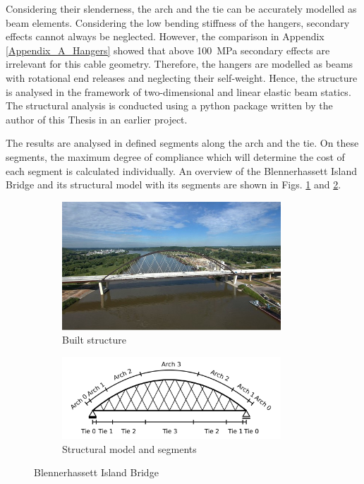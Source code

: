 Considering their slenderness, the arch and the tie can be accurately modelled as beam elements. Considering the low bending stiffness of the hangers, secondary effects cannot always be neglected. However, the comparison in Appendix \ref{Appendix_A_Hangers} showed that above \SI{100}{MPa} secondary effects are irrelevant for this cable geometry. Therefore, the hangers are modelled as beams with rotational end releases and neglecting their self-weight. Hence, the structure is analysed in the framework of two-dimensional and linear elastic beam statics. The structural analysis is conducted using a python package written by the author of this Thesis in an earlier project.\bigskip

The results are analysed in defined segments along the arch and the tie. On these segments, the maximum degree of compliance which will determine the cost of each segment is calculated individually. An overview of the Blennerhassett Island Bridge and its structural model with its segments are shown in Figs. \ref{fig:Blennerhassett2_a} and \ref{fig:fig:Blennerhassett2_b}.

\begin{figure}[H]
\centering
\begin{subfigure}{0.5\textwidth}
    \centering
    \includegraphics[width=0.9\textwidth]{overleaf/Pictures/Blennerhassett_2.jpg}
    \caption{Built structure}
    \label{fig:Blennerhassett2_a}
\end{subfigure}%
\begin{subfigure}{.5\textwidth}
    \centering
    \vspace*{0.67cm}
    \includegraphics[width=0.9\textwidth]{illustrations/model overview/segments.png}
    \vspace*{0.67cm}
    \caption{Structural model and segments}
    \label{fig:fig:Blennerhassett2_b}
\end{subfigure}
\caption{Blennerhassett Island Bridge}
\label{fig:Blennerhassett2}
\end{figure}

